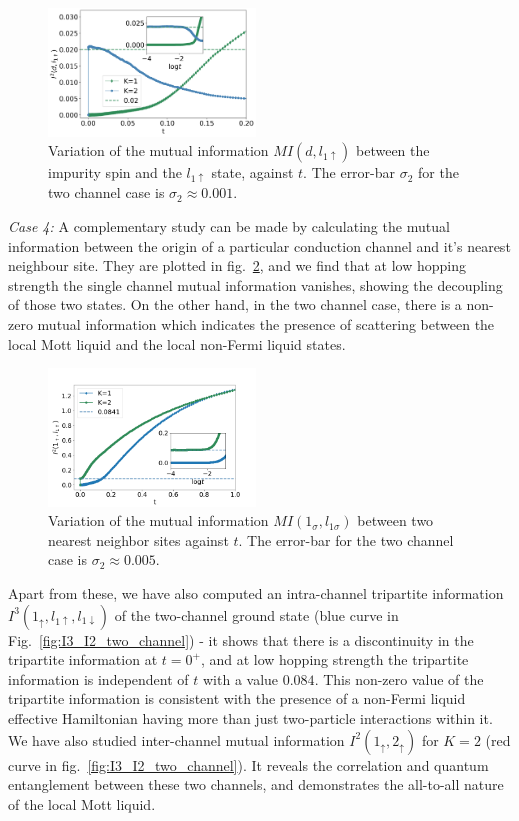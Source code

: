 \documentclass{iopart}
\begin{document}
\begin{figure}
\includegraphics[width=0.49\textwidth]{AI2ch12dl1up}
\caption{Variation of the mutual information $MI(d,l_{1\uparrow})$ between the impurity spin and the $l_{1\uparrow}$ state, against $t$. The error-bar $\sigma_2$ for the two channel case is $\sigma_2\approx 0.001$.}
\label{fig:MI_d_l1}
\end{figure}

\par \textit{Case 4:} A complementary study can be made by calculating the mutual information between the origin of a particular conduction channel and it's nearest neighbour site. They are plotted in fig.~\ref{fig:MI_l_l1}, and we find that at low hopping strength the single channel mutual information vanishes, showing the decoupling of those two states. On the other hand, in the two channel case, there is a non-zero mutual information which indicates the presence of scattering between the local Mott liquid and the local non-Fermi liquid states.

\begin{figure}[!htpb]
\includegraphics[width=0.49\textwidth]{AI2ch121l1}
\caption{Variation of the mutual information $MI(1_{\sigma},l_{1\sigma})$ between two nearest neighbor sites against \(t\). The error-bar for the two channel case is $\sigma_2\approx 0.005$.}
\label{fig:MI_l_l1}
\end{figure}

Apart from these, we have also computed an intra-channel tripartite information $I^3(1_{\uparrow},l_{1\uparrow},l_{1\downarrow})$ of the two-channel ground state (blue curve in Fig.~\ref{fig:I3_I2_two_channel}) - it shows that there is a discontinuity in the tripartite information at $t=0^+$, and at low hopping strength the tripartite information is independent of $t$ with a value $0.084$. This non-zero value of the tripartite information is consistent with the presence of a non-Fermi liquid effective Hamiltonian having more than just two-particle interactions within it. We have also studied inter-channel mutual information $I^2(1_{\uparrow},2_{\uparrow})$ for \(K=2\) (red curve in fig.~\ref{fig:I3_I2_two_channel}). It reveals the correlation and quantum entanglement between these two channels, and demonstrates the all-to-all nature of the local Mott liquid.
\end{document}
